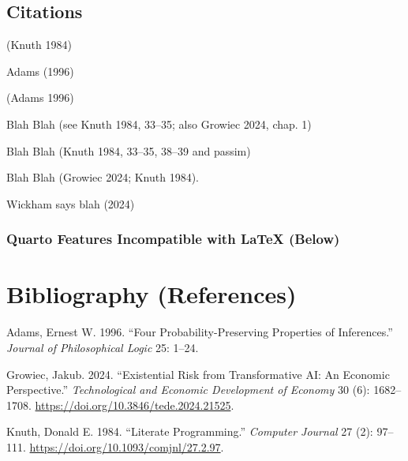 \documentclass[
  letterpaper,
]{book}
\newlength{\cslhangindent}
\newenvironment{CSLReferences}[2] %
 {\begin{list}{}{%
  \setlength{\itemindent}{0pt}
  \setlength{\leftmargin}{0pt}
  \setlength{\parsep}{0pt}
  \ifodd #1
   \setlength{\leftmargin}{\cslhangindent}
   \setlength{\itemindent}{-1\cslhangindent}
  \fi
  \setlength{\itemsep}{#2\baselineskip}}}
 {\end{list}}
\begin{document}
\section*{Citations}\label{sec-citations}


(Knuth 1984)

Adams (1996)

(Adams 1996)

Blah Blah (see Knuth 1984, 33--35; also Growiec 2024, chap. 1)

Blah Blah (Knuth 1984, 33--35, 38--39 and passim)

Blah Blah (Growiec 2024; Knuth 1984).

Wickham says blah (2024)

\subsection*{Quarto Features Incompatible with LaTeX
(Below)}\label{quarto-features-incompatible-with-latex-below}


\chapter*{Bibliography (References)}\label{bibliography-references}


\label{refs}
\begin{CSLReferences}{1}{0}
Adams, Ernest W. 1996. {``Four Probability-Preserving Properties of
Inferences.''} \emph{Journal of Philosophical Logic} 25: 1--24.

Growiec, Jakub. 2024. {``Existential Risk from Transformative {AI}: An
Economic Perspective.''} \emph{Technological and Economic Development of
Economy} 30 (6): 1682--1708.
\url{https://doi.org/10.3846/tede.2024.21525}.

Knuth, Donald E. 1984. {``Literate Programming.''} \emph{Computer
Journal} 27 (2): 97--111. \url{https://doi.org/10.1093/comjnl/27.2.97}.

\end{CSLReferences}
\end{document}
